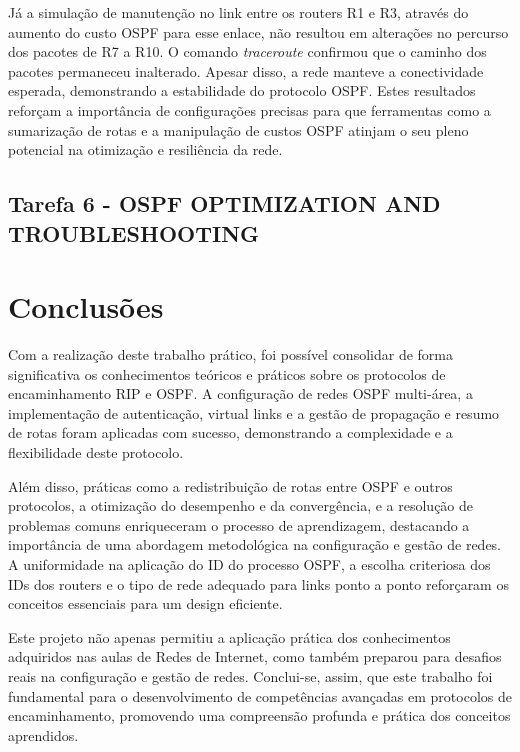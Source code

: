 \documentclass[11pt,english, openright, oneside]{book}
\begin{document}
\par Já a simulação de manutenção no link entre os routers R1 e R3, através do aumento do custo OSPF para esse enlace, não resultou em alterações no percurso dos pacotes de R7 a R10. O comando \textit{traceroute} confirmou que o caminho dos pacotes permaneceu inalterado. Apesar disso, a rede manteve a conectividade esperada, demonstrando a estabilidade do protocolo OSPF. Estes resultados reforçam a importância de configurações precisas para que ferramentas como a sumarização de rotas e a manipulação de custos OSPF atinjam o seu pleno potencial na otimização e resiliência da rede.

\pagebreak

\section{Tarefa 6 - OSPF OPTIMIZATION AND TROUBLESHOOTING}
\vspace{0.2cm}

\pagebreak

\chapter{Conclusões}
\vspace{0.2cm}

\par Com a realização deste trabalho prático, foi possível consolidar de forma significativa os conhecimentos teóricos e práticos sobre os protocolos de encaminhamento RIP e OSPF. A configuração de redes OSPF multi-área, a implementação de autenticação, virtual links e a gestão de propagação e resumo de rotas foram aplicadas com sucesso, demonstrando a complexidade e a flexibilidade deste protocolo.

\par Além disso, práticas como a redistribuição de rotas entre OSPF e outros protocolos, a otimização do desempenho e da convergência, e a resolução de problemas comuns enriqueceram o processo de aprendizagem, destacando a importância de uma abordagem metodológica na configuração e gestão de redes. A uniformidade na aplicação do ID do processo OSPF, a escolha criteriosa dos IDs dos routers e o tipo de rede adequado para links ponto a ponto reforçaram os conceitos essenciais para um design eficiente.

\par Este projeto não apenas permitiu a aplicação prática dos conhecimentos adquiridos nas aulas de Redes de Internet, como também preparou para desafios reais na configuração e gestão de redes. Conclui-se, assim, que este trabalho foi fundamental para o desenvolvimento de competências avançadas em protocolos de encaminhamento, promovendo uma compreensão profunda e prática dos conceitos aprendidos.
\pagebreak
\end{document}
